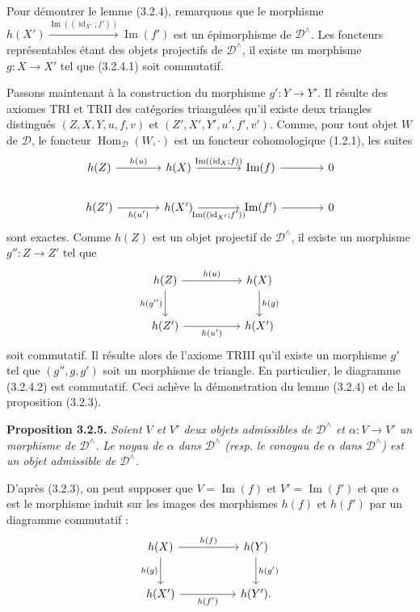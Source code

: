 \clearpage
{}%
\begingroup\small\setlength{\parskip}{0pt}\setlength{\emergencystretch}{1.5em}
Pour démontrer le lemme (3.2.4), remarquons que le morphisme
$h(X')\xrightarrow{\operatorname{Im}((\operatorname{id}_{X'};f'))}
\operatorname{Im}(f')$ est un épimorphisme de $\mathcal D^\wedge$. Les
foncteurs représentables étant des objets projectifs de $\mathcal D^\wedge$,
il existe un morphisme $g\colon X\to X'$ tel
que (3.2.4.1) soit commutatif.

Passons maintenant à la construction du morphisme $g'\colon Y\to Y'$.
Il résulte des axiomes TRI et TRII des
catégories triangulées qu'il existe deux triangles distingués
$(Z,X,Y,u,f,v)$ et $(Z',X',Y',u',f',v')$. Comme, pour tout objet $W$ de
$\mathcal D$, le foncteur
$\operatorname{Hom}_{\mathcal D}(W,\mathord\cdot)$ est un foncteur
cohomologique (1.2.1), les
suites
\[
\begin{tikzcd}[column sep=3.7em]
h(Z)\arrow[r,"h(u)"]&h(X)\arrow[r,"\operatorname{Im}((\operatorname{id}_X;f))"]&\operatorname{Im}(f)\arrow[r]&0\\
h(Z')\arrow[r,"h(u')"']&h(X')\arrow[r,"\operatorname{Im}((\operatorname{id}_{X'};f'))"']&\operatorname{Im}(f')\arrow[r]&0
\end{tikzcd}
\]
sont exactes. Comme $h(Z)$ est un objet projectif de $\mathcal D^\wedge$, il
existe un morphisme $g''\colon Z\to Z'$ tel
que
\[
\begin{tikzcd}[column sep=5em,row sep=2.3em]
h(Z)\arrow[r,"h(u)"]\arrow[d,"h(g'')"']&h(X)\arrow[d,"h(g)"]\\
h(Z')\arrow[r,"h(u')"']&h(X')
\end{tikzcd}
\]
soit commutatif. Il résulte alors de l'axiome TRIII qu'il existe un morphisme
$g'$ tel que $(g'',g,g')$ soit un morphisme de triangle. En particulier, le
diagramme (3.2.4.2) est commutatif. Ceci achève la démonstration du lemme
(3.2.4) et de la proposition (3.2.3).

\medskip\noindent\textbf{Proposition 3.2.5.}\quad
\textit{Soient $V$ et $V'$ deux objets admissibles de $\mathcal D^\wedge$ et
$\alpha\colon V\to V'$ un morphisme de $\mathcal D^\wedge$. Le noyau de
$\alpha$ dans $\mathcal D^\wedge$ (resp. le conoyau de $\alpha$ dans
$\mathcal D^\wedge$) est un objet admissible de $\mathcal D^\wedge$.}

D'après (3.2.3), on peut supposer que $V=\operatorname{Im}(f)$ et
$V'=\operatorname{Im}(f')$ et que $\alpha$ est le morphisme induit sur les
images des morphismes $h(f)$ et $h(f')$ par un diagramme commutatif :
\[
\begin{tikzcd}[column sep=5em,row sep=2.4em]
h(X)\arrow[r,"h(f)"]\arrow[d,"h(g)"']&h(Y)\arrow[d,"h(g')"]\\
h(X')\arrow[r,"h(f')"']&h(Y').
\end{tikzcd}
\]
\endgroup
